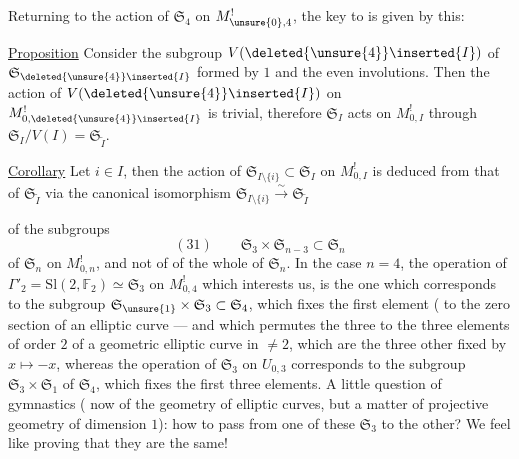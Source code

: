Returning to the action of $\mathfrak{S}_4$ on
$M_{\unsure{0},4}^{!}$, the key to 
is given by this:

\uline{Proposition} Consider the subgroup
$V(\deleted{\unsure{4}}\inserted{I})$ of $\mathfrak{S}_{\deleted{\unsure{4}}\inserted{I}}$ formed by $1$ and the even
involutions. Then the action of $V(\deleted{\unsure{4}}\inserted{I})$ on $M_{0,\deleted{\unsure{4}}\inserted{I}}^{!}$
is trivial,  therefore  $\mathfrak{S}_I$ acts
on $M_{0,I}^{!}$ through
$\mathfrak{S}_I/V(I)=\mathfrak{S}_{\widetilde I}$.


\uline{Corollary} Let $i\in I$, then the action
of $\mathfrak{S}_{I\setminus\{i\}}\subset\mathfrak{S}_I$ on $M_{0,I}^{!}$ is deduced
from that of $\mathfrak{S}_{\widetilde I}$ via the canonical isomorphism $\mathfrak{S}_{I\setminus\{i\}}\xrightarrow{\sim}\mathfrak{S}_{\widetilde I}$

 of the subgroups
\[
 (31)\qquad \mathfrak{S}_3\times\mathfrak{S}_{n-3}\subset\mathfrak{S}_n
\]
of $\mathfrak{S}_n$ on $M_{0,n}^{!}$, and not of  of
the whole of $\mathfrak{S}_n$. In the case $n=4$,
the operation of $\Gamma'_2=\mathrm{Sl}(2,\mathbb{F}_2)\simeq\mathfrak{S}_3$ on
$M_{0,4}^{!}$ which interests us, is the one which
corresponds to the subgroup $\mathfrak{S}_{\unsure{1}}\times\mathfrak{S}_3\subset\mathfrak{S}_4$,
which fixes the first element ( to
the zero section of an elliptic curve
---  and which permutes the three 
 to the three elements of order $2$
of a geometric elliptic curve in  $\ne 2$, which
are the three other  fixed by
$x\mapsto -x$, whereas the  operation of
$\mathfrak{S}_3$ on $U_{0,3}$ corresponds to the subgroup
$\mathfrak{S}_3\times\mathfrak{S}_1$ of $\mathfrak{S}_4$, which fixes the first three
elements. A little question of 
gymnastics ( now of the
geometry of elliptic curves, but
a matter of projective geometry of dimension $1$):
how to pass from one of these 
$\mathfrak{S}_3$ to the other? We feel like proving that
they are the same!

